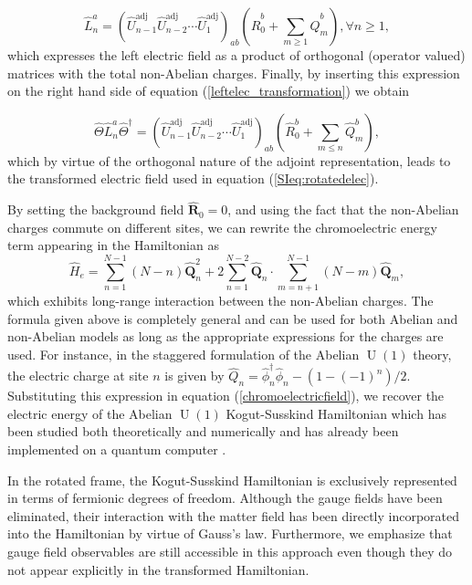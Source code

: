 \documentclass[twocolumn,aps,showpacs,prb,superscriptaddress,floatfix,10pt,nofootinbib]{revtex4-2}
\begin{document}
\begin{equation}
\hat{L}_{n}^{a}=(\hat{U}_{n-1}^{\mathrm{adj}}\hat{U}_{n-2}^{\mathrm{adj}}\cdots \hat{U}_{1}^{\mathrm{adj}})_{ab} \left( \hat{R}_{0}^{b}+\sum_{m\geq 1}\hat{Q}_{m}^{b} \right), \forall n\geq 1,
\end{equation}
which expresses the left electric field as a product of orthogonal (operator valued) matrices with the total non-Abelian charges. Finally, by inserting this expression on the right hand side of equation (\ref{leftelec_transformation}) we obtain 

\begin{equation}
\hat{\Theta} \hat{L}_{n}^{a} \hat{\Theta}^{\dagger}= (\hat{U}_{n-1}^{\mathrm{adj}}\hat{U}_{n-2}^{\mathrm{adj}}\cdots \hat{U}_{1}^{\mathrm{adj}})_{ab} \left( \hat{R}_{0}^{b}+\sum_{m\leq n}\hat{Q}_{m}^{b} \right),
\end{equation} 
which by virtue of the orthogonal nature of the adjoint representation, leads to the transformed electric field used in equation (\ref{SIeq:rotatedelec}).

By setting the background field $\hat{\boldsymbol{R}}_{0}=0$, and
using the fact that the non-Abelian charges commute on different sites, we can rewrite the chromoelectric energy term appearing in the Hamiltonian as
\begin{equation}
\hat{H}_{e}=\sum_{n=1}^{N-1}(N-n)\hat{\boldsymbol{Q}}_{n}^{2}+2\sum_{n=1}^{N-2}\hat{\boldsymbol{Q}}_{n}\cdot\sum_{m=n+1}^{N-1}(N-m)\hat{\boldsymbol{Q}}_{m}, \label{chromoelectricfield}
\end{equation} 
which exhibits long-range interaction between the non-Abelian charges. The formula given above is completely general and can be used for both Abelian and non-Abelian models as long as the appropriate expressions for the charges are used. For instance, in the staggered formulation of the Abelian $\operatorname{U}(1)$ theory, the electric charge at site $n$ is given by $\hat{Q}_{n}=\hat{\phi}_{n}^{\dagger}\hat{\phi}_{n}-( 1-(-1)^{n})/2$. Substituting this expression in equation (\ref{chromoelectricfield}), we recover the electric energy of the Abelian $\operatorname{U}(1)$ Kogut-Susskind Hamiltonian which has been studied both theoretically and numerically \cite{hamer_series_1997, banuls_density_2017} and has already been implemented on a quantum computer \cite{muschik_u1_2017,martinez_real-time_2016}. 

In the rotated frame, the Kogut-Susskind Hamiltonian is exclusively represented in terms of fermionic degrees of freedom. Although the gauge fields have been eliminated, their interaction with the matter field has been directly incorporated into the Hamiltonian by virtue of Gauss's law. Furthermore, we emphasize that gauge field observables are still accessible in this approach even though they do not appear explicitly in the transformed Hamiltonian.
\end{document}
